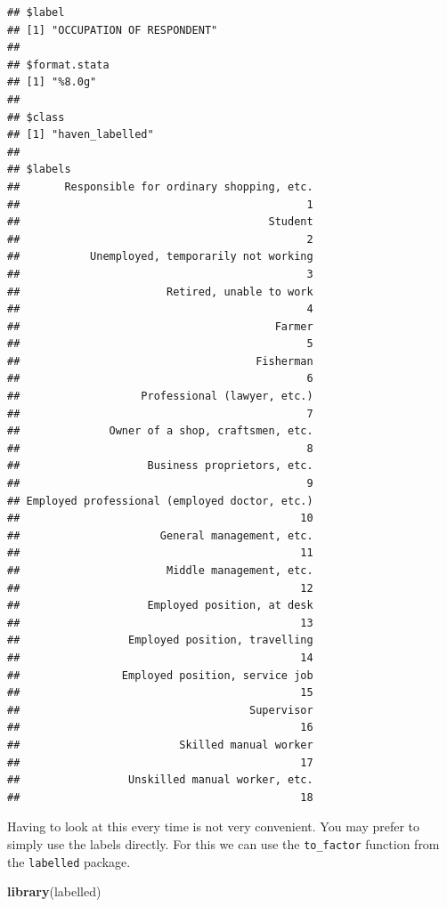 \documentclass[]{book}
\newenvironment{Shaded}{\begin{snugshade}}{\end{snugshade}}
\newcommand{\KeywordTok}[1]{\textcolor[rgb]{0.13,0.29,0.53}{\textbf{#1}}}
\newcommand{\NormalTok}[1]{#1}
\theoremstyle{definition}
\theoremstyle{definition}
\theoremstyle{definition}
\theoremstyle{remark}
\begin{document}
\begin{verbatim}
## $label
## [1] "OCCUPATION OF RESPONDENT"
## 
## $format.stata
## [1] "%8.0g"
## 
## $class
## [1] "haven_labelled"
## 
## $labels
##       Responsible for ordinary shopping, etc. 
##                                             1 
##                                       Student 
##                                             2 
##           Unemployed, temporarily not working 
##                                             3 
##                       Retired, unable to work 
##                                             4 
##                                        Farmer 
##                                             5 
##                                     Fisherman 
##                                             6 
##                   Professional (lawyer, etc.) 
##                                             7 
##              Owner of a shop, craftsmen, etc. 
##                                             8 
##                    Business proprietors, etc. 
##                                             9 
## Employed professional (employed doctor, etc.) 
##                                            10 
##                      General management, etc. 
##                                            11 
##                       Middle management, etc. 
##                                            12 
##                    Employed position, at desk 
##                                            13 
##                 Employed position, travelling 
##                                            14 
##                Employed position, service job 
##                                            15 
##                                    Supervisor 
##                                            16 
##                         Skilled manual worker 
##                                            17 
##                 Unskilled manual worker, etc. 
##                                            18
\end{verbatim}

Having to look at this every time is not very convenient. You may prefer
to simply use the labels directly. For this we can use the
\texttt{to\_factor} function from the \texttt{labelled} package.

\begin{Shaded}
\begin{Highlighting}[]
\KeywordTok{library}\NormalTok{(labelled)}
\end{Highlighting}
\end{Shaded}
\end{document}
